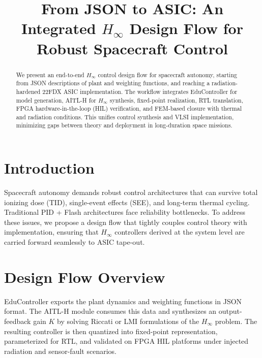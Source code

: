 \documentclass[conference]{IEEEtran}
\begin{document}
\title{From JSON to ASIC: An Integrated $H_\infty$ Design Flow for Robust Spacecraft Control}

\author{
}

\maketitle

\begin{abstract}
We present an end-to-end $H_\infty$ control design flow for spacecraft autonomy,
starting from JSON descriptions of plant and weighting functions, and reaching
a radiation-hardened 22FDX ASIC implementation. The workflow integrates
EduController for model generation, AITL-H for $H_\infty$ synthesis, fixed-point
realization, RTL translation, FPGA hardware-in-the-loop (HIL) verification,
and FEM-based closure with thermal and radiation conditions. This unifies
control synthesis and VLSI implementation, minimizing gaps between theory and
deployment in long-duration space missions.
\end{abstract}

\section{Introduction}
Spacecraft autonomy demands robust control architectures that can survive
total ionizing dose (TID), single-event effects (SEE), and long-term thermal
cycling. Traditional PID + Flash architectures face reliability bottlenecks.
To address these issues, we propose a design flow that tightly couples control
theory with implementation, ensuring that $H_\infty$ controllers derived at
the system level are carried forward seamlessly to ASIC tape-out.

\section{Design Flow Overview}
EduController exports the plant dynamics and weighting functions in JSON
format. The AITL-H module consumes this data and synthesizes an
output-feedback gain $K$ by solving Riccati or LMI formulations of the
$H_\infty$ problem. The resulting controller is then quantized into fixed-point
representation, parameterized for RTL, and validated on FPGA HIL platforms
under injected radiation and sensor-fault scenarios.
\end{document}
